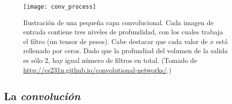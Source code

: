 \begin{figure}
  \centering
  \texttt{[image: conv\_process]}
  \caption{Ilustración de una pequeña capa convolucional.
    Cada imagen de entrada contiene tres niveles de profundidad, con los cuales trabaja
    el filtro (un tensor de pesos). Cabe destacar que cada valor de $x$ está rellenado por ceros.
    Dado que la profundiad del volumen de la salida es sólo 2, hay igual número de filtros en total.
    (Tomado de \url{http://cs231n.github.io/convolutional-networks/}.)}
  \label{fCNN_fig}
\end{figure}

\subsection{La \emph{convolución}}

